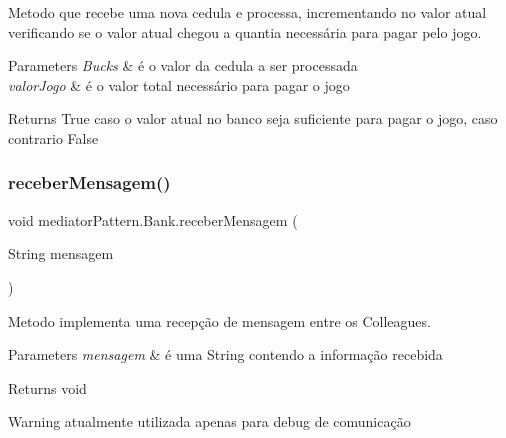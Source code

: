 Metodo que recebe uma nova cedula e processa, incrementando no valor atual verificando se o valor atual chegou a quantia necessária para pagar pelo jogo. 


\begin{DoxyParams}{Parameters}
{\em Bucks} & é o valor da cedula a ser processada \\
\hline
{\em valor\+Jogo} & é o valor total necessário para pagar o jogo \\
\hline
\end{DoxyParams}
\begin{DoxyReturn}{Returns}
True caso o valor atual no banco seja suficiente para pagar o jogo, caso contrario False 
\end{DoxyReturn}
\mbox{\label{classmediator_pattern_1_1_bank_a6a7daed810dd886ff48fb95a1adc977c}} 
\subsubsection{\texorpdfstring{receberMensagem()}{receberMensagem()}}
{\footnotesize\ttfamily void mediator\+Pattern.\+Bank.\+receber\+Mensagem (\begin{DoxyParamCaption}\item[{String}]{mensagem }\end{DoxyParamCaption})}



Metodo implementa uma recepção de mensagem entre os Colleagues. 


\begin{DoxyParams}{Parameters}
{\em mensagem} & é uma String contendo a informação recebida \\
\hline
\end{DoxyParams}
\begin{DoxyReturn}{Returns}
void 
\end{DoxyReturn}
\begin{DoxyWarning}{Warning}
atualmente utilizada apenas para debug de comunicação 
\end{DoxyWarning}
\mbox{\label{classmediator_pattern_1_1_bank_a8851099b55fb54ca7b0c053745411804}} 
